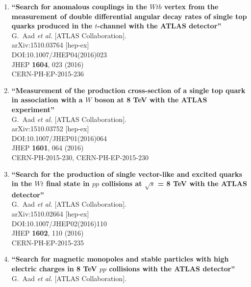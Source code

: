 \documentclass{article}
\begin{document}
\begin{enumerate}
\item%
{\bf ``Search for anomalous couplings in the $Wtb$ vertex from the measurement of double differential angular decay rates of single top quarks produced in the $t$-channel with the ATLAS detector''}
  \\{}G.~Aad {\it et al.} [ATLAS Collaboration].
  \\{}arXiv:1510.03764 [hep-ex]
  \\{}DOI:10.1007/JHEP04(2016)023
  \\{}JHEP {\bf 1604}, 023 (2016)
  \\{}CERN-PH-EP-2015-236
\item%
{\bf ``Measurement of the production cross-section of a single top quark in association with a $W$ boson at 8 TeV with the ATLAS experiment''}
  \\{}G.~Aad {\it et al.} [ATLAS Collaboration].
  \\{}arXiv:1510.03752 [hep-ex]
  \\{}DOI:10.1007/JHEP01(2016)064
  \\{}JHEP {\bf 1601}, 064 (2016)
  \\{}CERN-PH-2015-230, CERN-PH-EP-2015-230
\item%
{\bf ``Search for the production of single vector-like and excited quarks in the $Wt$ final state in $pp$ collisions at $\sqrt{s}$ = 8 TeV with the ATLAS detector''}
  \\{}G.~Aad {\it et al.} [ATLAS Collaboration].
  \\{}arXiv:1510.02664 [hep-ex]
  \\{}DOI:10.1007/JHEP02(2016)110
  \\{}JHEP {\bf 1602}, 110 (2016)
  \\{}CERN-PH-EP-2015-235
\item%
{\bf ``Search for magnetic monopoles and stable particles with high electric charges in 8 TeV $pp$ collisions with the ATLAS detector''}
  \\{}G.~Aad {\it et al.} [ATLAS Collaboration].

\end{enumerate}
\end{document}
